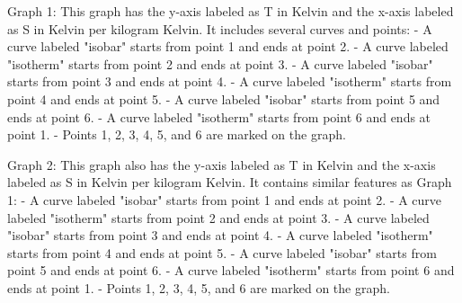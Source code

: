 Graph 1: This graph has the y-axis labeled as T in Kelvin and the x-axis labeled as S in Kelvin per kilogram Kelvin. It includes several curves and points:
- A curve labeled "isobar" starts from point 1 and ends at point 2.
- A curve labeled "isotherm" starts from point 2 and ends at point 3.
- A curve labeled "isobar" starts from point 3 and ends at point 4.
- A curve labeled "isotherm" starts from point 4 and ends at point 5.
- A curve labeled "isobar" starts from point 5 and ends at point 6.
- A curve labeled "isotherm" starts from point 6 and ends at point 1.
- Points 1, 2, 3, 4, 5, and 6 are marked on the graph.

Graph 2: This graph also has the y-axis labeled as T in Kelvin and the x-axis labeled as S in Kelvin per kilogram Kelvin. It contains similar features as Graph 1:
- A curve labeled "isobar" starts from point 1 and ends at point 2.
- A curve labeled "isotherm" starts from point 2 and ends at point 3.
- A curve labeled "isobar" starts from point 3 and ends at point 4.
- A curve labeled "isotherm" starts from point 4 and ends at point 5.
- A curve labeled "isobar" starts from point 5 and ends at point 6.
- A curve labeled "isotherm" starts from point 6 and ends at point 1.
- Points 1, 2, 3, 4, 5, and 6 are marked on the graph.